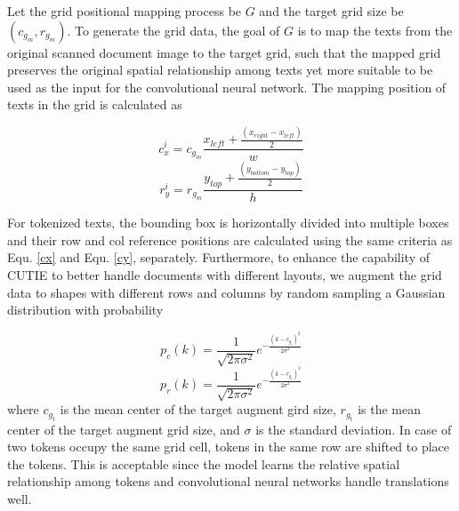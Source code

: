 \documentclass[10pt,twocolumn,letterpaper]{article}
\begin{document}
Let the grid positional mapping process be $G$ and the target grid size be $(c_{g_m}, r_{g_m})$. To generate the grid data, the goal of $G$ is to map the texts from the original scanned document image to the target grid, such that the mapped grid preserves the original spatial relationship among texts yet more suitable to be used as the input for the convolutional neural network. The mapping position of texts in the grid is calculated as

\begin{equation}
\label{cx}
c^i_x = c_{g_m} \frac{x_{left} + \frac{(x_{right} - x_{left})}{2}}{w}
\end{equation}
\begin{equation}
\label{cy}
r^i_y = r_{g_m} \frac{y_{top} + \frac{(y_{bottom} - y_{top})}{2}}{h}
\end{equation}

For tokenized texts, the bounding box is horizontally divided into multiple boxes and their row and col reference positions are calculated using the same criteria as Equ. \ref{cx} and Equ. \ref{cy}, separately. Furthermore, to enhance the capability of CUTIE to better handle documents with different layouts, we augment the grid data to shapes with different rows and columns by random sampling a Gaussian distribution with probability

\begin{equation}
\label{augmentc}
p_c(k) = \frac{1}{\sqrt{2 \pi \sigma^2}} e^{- \frac{(k - c_{g_t})^2}{2 \sigma^2}}
\end{equation}
\begin{equation}
\label{augmentr}
p_r(k) = \frac{1}{\sqrt{2 \pi \sigma^2}} e^{- \frac{(k - r_{g_t})^2}{2 \sigma^2}}
\end{equation}
where $c_{g_t}$ is the mean center of the target augment gird size, $r_{g_t}$ is the mean center of the target augment grid size, and $\sigma$ is the standard deviation. In case of two tokens occupy the same grid cell, tokens in the same row are shifted to place the tokens. This is acceptable since the model learns the relative spatial relationship among tokens and convolutional neural networks handle translations well.
\end{document}
